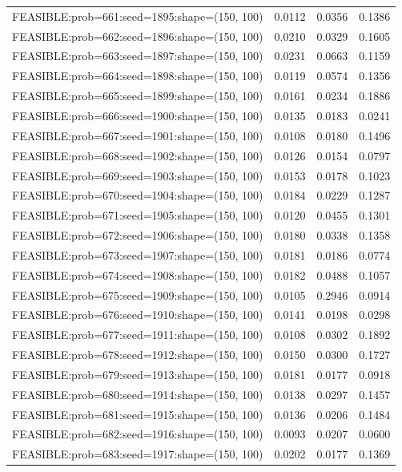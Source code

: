 \begin{longtable}{lccc}
FEASIBLE:prob=661:seed=1895:shape=(150, 100) & 0.0112 & 0.0356 & 0.1386 \\
FEASIBLE:prob=662:seed=1896:shape=(150, 100) & 0.0210 & 0.0329 & 0.1605 \\
FEASIBLE:prob=663:seed=1897:shape=(150, 100) & 0.0231 & 0.0663 & 0.1159 \\
FEASIBLE:prob=664:seed=1898:shape=(150, 100) & 0.0119 & 0.0574 & 0.1356 \\
FEASIBLE:prob=665:seed=1899:shape=(150, 100) & 0.0161 & 0.0234 & 0.1886 \\
FEASIBLE:prob=666:seed=1900:shape=(150, 100) & 0.0135 & 0.0183 & 0.0241 \\
FEASIBLE:prob=667:seed=1901:shape=(150, 100) & 0.0108 & 0.0180 & 0.1496 \\
FEASIBLE:prob=668:seed=1902:shape=(150, 100) & 0.0126 & 0.0154 & 0.0797 \\
FEASIBLE:prob=669:seed=1903:shape=(150, 100) & 0.0153 & 0.0178 & 0.1023 \\
FEASIBLE:prob=670:seed=1904:shape=(150, 100) & 0.0184 & 0.0229 & 0.1287 \\
FEASIBLE:prob=671:seed=1905:shape=(150, 100) & 0.0120 & 0.0455 & 0.1301 \\
FEASIBLE:prob=672:seed=1906:shape=(150, 100) & 0.0180 & 0.0338 & 0.1358 \\
FEASIBLE:prob=673:seed=1907:shape=(150, 100) & 0.0181 & 0.0186 & 0.0774 \\
FEASIBLE:prob=674:seed=1908:shape=(150, 100) & 0.0182 & 0.0488 & 0.1057 \\
FEASIBLE:prob=675:seed=1909:shape=(150, 100) & 0.0105 & 0.2946 & 0.0914 \\
FEASIBLE:prob=676:seed=1910:shape=(150, 100) & 0.0141 & 0.0198 & 0.0298 \\
FEASIBLE:prob=677:seed=1911:shape=(150, 100) & 0.0108 & 0.0302 & 0.1892 \\
FEASIBLE:prob=678:seed=1912:shape=(150, 100) & 0.0150 & 0.0300 & 0.1727 \\
FEASIBLE:prob=679:seed=1913:shape=(150, 100) & 0.0181 & 0.0177 & 0.0918 \\
FEASIBLE:prob=680:seed=1914:shape=(150, 100) & 0.0138 & 0.0297 & 0.1457 \\
FEASIBLE:prob=681:seed=1915:shape=(150, 100) & 0.0136 & 0.0206 & 0.1484 \\
FEASIBLE:prob=682:seed=1916:shape=(150, 100) & 0.0093 & 0.0207 & 0.0600 \\
FEASIBLE:prob=683:seed=1917:shape=(150, 100) & 0.0202 & 0.0177 & 0.1369 \\

\end{longtable}
